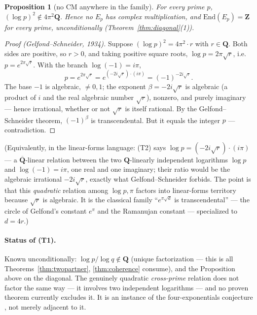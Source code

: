 \documentclass[11pt]{article}
\newtheorem*{proposition}{Proposition}
\theoremstyle{definition}
\theoremstyle{remark}
\newcommand{\Z}{\mathbf{Z}}
\newcommand{\Q}{\mathbf{Q}}
\newcommand{\End}{\mathrm{End}}
\begin{document}
\begin{proposition}[no CM anywhere in the family]
For every prime $p$, $(\log p)^2 \notin 4\pi^2\Q$. Hence no $E_p$ has
complex multiplication, and $\End(E_p) = \Z$ for every prime,
unconditionally (Theorem~\ref{thm:diagonal}(1)).
\end{proposition}

\begin{proof}[Proof (Gelfond--Schneider, 1934)]
Suppose $(\log p)^2 = 4\pi^2\cdot r$ with $r \in \Q$. Both sides are
positive, so $r > 0$, and taking positive square roots,
$\log p = 2\pi\sqrt{r}$, i.e.\ $p = e^{2\pi\sqrt{r}}$. With the branch
$\log(-1) = i\pi$,
\[
p = e^{2\pi\sqrt{r}} = e^{(-2i\sqrt{r})\cdot(i\pi)} = (-1)^{-2i\sqrt{r}} .
\]
The base $-1$ is algebraic, $\neq 0, 1$; the exponent
$\beta = -2i\sqrt{r}$ is algebraic (a product of $i$ and the real algebraic
number $\sqrt{r}$), nonzero, and purely imaginary --- hence irrational,
whether or not $\sqrt{r}$ is itself rational. By the Gelfond--Schneider
theorem, $(-1)^\beta$ is transcendental. But it equals the integer $p$ ---
contradiction.
\end{proof}

(Equivalently, in the linear-forms language: (T2) says
$\log p = (-2i\sqrt{r})\cdot(i\pi)$ --- a $\overline{\Q}$-linear relation
between the two $\Q$-linearly independent logarithms $\log p$ and
$\log(-1) = i\pi$, one real and one imaginary; their ratio would be the
algebraic irrational $-2i\sqrt{r}$, exactly what Gelfond--Schneider forbids.
The point is that this \emph{quadratic} relation among $\log p, \pi$ factors
into linear-forms territory because $\sqrt{r}$ is algebraic. It is the
classical family ``$e^{\pi\sqrt{d}}$ is transcendental'' --- the circle of
Gelfond's constant $e^\pi$ and the Ramanujan constant --- specialized to
$d = 4r$.)

\paragraph{Status of (T1).}
Known unconditionally: $\log p/\log q \notin \Q$ (unique factorization ---
this is all Theorems~\ref{thm:twopartner}, \ref{thm:coherence} consume), and
the Proposition above on the diagonal. The genuinely quadratic
\emph{cross-prime} relation does not factor the same way --- it involves two
independent logarithms --- and no proven theorem currently excludes it. It
is an instance of the four-exponentials conjecture \cite{FourExp}, not
merely adjacent to it.
\end{document}

